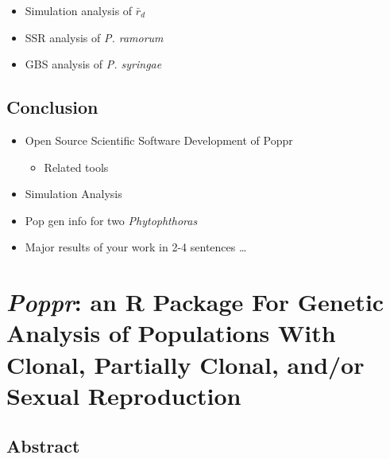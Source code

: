 \documentclass[double,12pt]{beavtex}
\providecommand{\tightlist}{%
  \setlength{\itemsep}{0pt}\setlength{\parskip}{0pt}}
\begin{document}
  \begin{itemize}
  \tightlist
  \item
    Simulation analysis of \(\bar{r}_d\)
  \item
    SSR analysis of \emph{P. ramorum}
  \item
    GBS analysis of \emph{P. syringae}
  \end{itemize}
  
  \section{Conclusion}\label{conclusion}
  
  \begin{itemize}
  \tightlist
  \item
    Open Source Scientific Software Development of Poppr
  
    \begin{itemize}
    \tightlist
    \item
      Related tools
    \end{itemize}
  \item
    Simulation Analysis
  \item
    Pop gen info for two \emph{Phytophthoras}
  \item
    Major results of your work in 2-4 sentences \ldots{}
  \end{itemize}
  
  \chapter{\texorpdfstring{\emph{Poppr}: an R Package For Genetic Analysis
  of Populations With Clonal, Partially Clonal, and/or Sexual
  Reproduction}{Poppr: an R Package For Genetic Analysis of Populations With Clonal, Partially Clonal, and/or Sexual Reproduction}}\label{poppr-an-r-package-for-genetic-analysis-of-populations-with-clonal-partially-clonal-andor-sexual-reproduction}
  
  \section{Abstract}\label{abstract}
  
\end{document}
